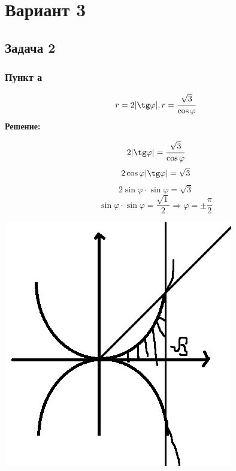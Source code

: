 \section*{Вариант 3}
\subsection*{Задача 2}
\subsubsection*{Пункт а}
$$
r=2|\tg \varphi|, r = \cfrac{\sqrt{3}}{\cos\varphi}
$$
\textbf{Решение:}

\begin{minipage}{0.6\textwidth}
$$
2 | \tg \varphi | = \cfrac{\sqrt{3}}{\cos \varphi}
$$
$$
2 \cos \varphi |\tg \varphi|=\sqrt{3} 
$$
$$
2 \sin \varphi \cdot \sin \varphi = \sqrt{3} 
$$
$$
\sin \varphi \cdot \sin \varphi = \frac{\sqrt{1}}{2} \Rightarrow \varphi= \pm \frac{\pi}{2} 
$$

\end{minipage}
\hfill
\begin{minipage}{0.3\textwidth}\raggedleft
\includegraphics[width=\linewidth]{pics/pic4.png}
\end{minipage}


